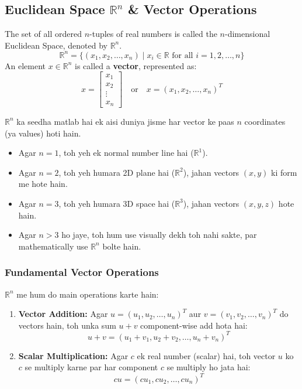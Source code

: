 \documentclass[11pt,a4paper]{article}
\begin{document}
\subsection{Euclidean Space $\mathbb{R}^n$ \& Vector Operations}

\begin{definitionbox}
The set of all ordered $n$-tuples of real numbers is called the $n$-dimensional Euclidean Space, denoted by $\mathbb{R}^n$.
\[ \mathbb{R}^n = \{ (x_1, x_2, \dots, x_n) \mid x_i \in \mathbb{R} \text{ for all } i = 1, 2, \dots, n \} \]
An element $x \in \mathbb{R}^n$ is called a \textbf{vector}, represented as:
\[ x = \begin{bmatrix} x_1 \\ x_2 \\ \vdots \\ x_n \end{bmatrix} \quad \text{or} \quad x = (x_1, x_2, \dots, x_n)^T \]
\end{definitionbox}

\begin{hinglishbox}
$\mathbb{R}^n$ ka seedha matlab hai ek aisi duniya jisme har vector ke paas $n$ coordinates (ya values) hoti hain.
\begin{itemize}
    \item Agar $n=1$, toh yeh ek normal number line hai ($\mathbb{R}^1$).
    \item Agar $n=2$, toh yeh humara 2D plane hai ($\mathbb{R}^2$), jahan vectors $(x, y)$ ki form me hote hain.
    \item Agar $n=3$, toh yeh humara 3D space hai ($\mathbb{R}^3$), jahan vectors $(x, y, z)$ hote hain.
    \item Agar $n > 3$ ho jaye, toh hum use visually dekh toh nahi sakte, par mathematically use $\mathbb{R}^n$ bolte hain.
\end{itemize}
\end{hinglishbox}

\subsubsection{Fundamental Vector Operations}
$\mathbb{R}^n$ me hum do main operations karte hain:
\begin{enumerate}
    \item \textbf{Vector Addition:} Agar $u = (u_1, u_2, \dots, u_n)^T$ aur $v = (v_1, v_2, \dots, v_n)^T$ do vectors hain, toh unka sum $u + v$ component-wise add hota hai:
    \[ u + v = (u_1 + v_1, u_2 + v_2, \dots, u_n + v_n)^T \]
    \item \textbf{Scalar Multiplication:} Agar $c$ ek real number (scalar) hai, toh vector $u$ ko $c$ se multiply karne par har component $c$ se multiply ho jata hai:
    \[ c u = (c u_1, c u_2, \dots, c u_n)^T \]
\end{enumerate}
\end{document}
